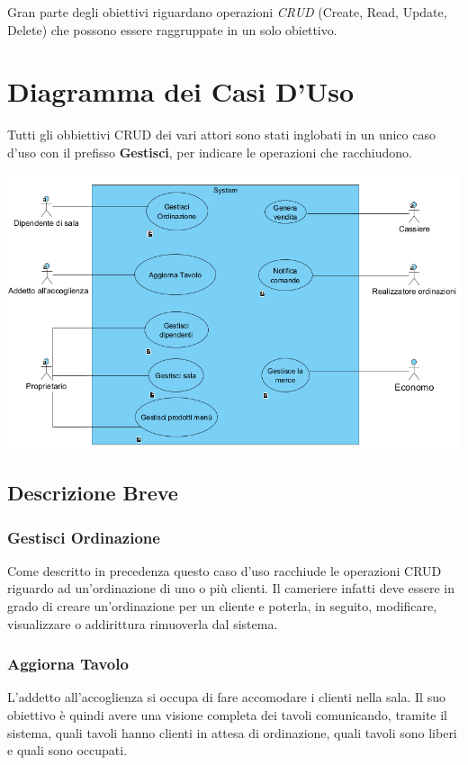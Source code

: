 Gran parte degli obiettivi riguardano operazioni \textit{CRUD} (Create, Read, Update, Delete) che possono essere raggruppate in un solo obiettivo.

\section{Diagramma dei Casi D'Uso}
Tutti gli obbiettivi CRUD dei vari attori sono stati inglobati in un unico caso d'uso con il prefisso \textbf{Gestisci}, per indicare le operazioni che racchiudono.
\begin{centering}
	\includegraphics[width=\textwidth]{Immagini/DiagrammaCasiUso.png}
\end{centering}

\subsection{Descrizione Breve}
\subsubsection{Gestisci Ordinazione}
Come descritto in precedenza questo caso d'uso racchiude le operazioni CRUD riguardo ad un'ordinazione di uno o più clienti. Il cameriere infatti deve essere in grado di creare un'ordinazione per un cliente e poterla, in seguito, modificare, visualizzare o addirittura rimuoverla dal sistema.

\subsubsection{Aggiorna Tavolo}
L'addetto all'accoglienza si occupa di fare accomodare i clienti nella sala. Il suo obiettivo è quindi avere una visione completa dei tavoli comunicando, tramite il sistema, quali tavoli hanno clienti in attesa di ordinazione, quali tavoli sono liberi e quali sono occupati.

